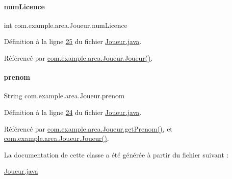 \mbox{\label{classcom_1_1example_1_1area_1_1_joueur_a559bd07d0a47e8fc1ec3050890f00589}} 
\paragraph{\texorpdfstring{num\+Licence}{numLicence}}
{\footnotesize\ttfamily int com.\+example.\+area.\+Joueur.\+num\+Licence\hspace{0.3cm}{\ttfamily [private]}}



Définition à la ligne \hyperlink{_joueur_8java_source_l00025}{25} du fichier \hyperlink{_joueur_8java_source}{Joueur.\+java}.



Référencé par \hyperlink{_joueur_8java_source_l00028}{com.\+example.\+area.\+Joueur.\+Joueur()}.

\mbox{\label{classcom_1_1example_1_1area_1_1_joueur_a9a49f14719dfc48cf557ef8677e2b2bc}} 
\paragraph{\texorpdfstring{prenom}{prenom}}
{\footnotesize\ttfamily String com.\+example.\+area.\+Joueur.\+prenom\hspace{0.3cm}{\ttfamily [private]}}



Définition à la ligne \hyperlink{_joueur_8java_source_l00024}{24} du fichier \hyperlink{_joueur_8java_source}{Joueur.\+java}.



Référencé par \hyperlink{_joueur_8java_source_l00047}{com.\+example.\+area.\+Joueur.\+get\+Prenom()}, et \hyperlink{_joueur_8java_source_l00028}{com.\+example.\+area.\+Joueur.\+Joueur()}.



La documentation de cette classe a été générée à partir du fichier suivant \+:\begin{DoxyCompactItemize}
\item 
\hyperlink{_joueur_8java}{Joueur.\+java}\end{DoxyCompactItemize}
